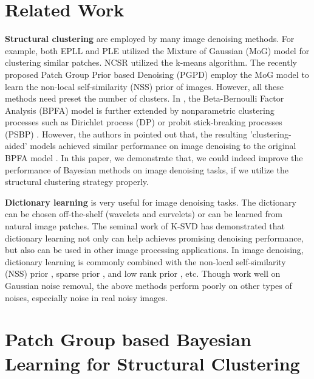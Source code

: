 \documentclass[runningheads]{llncs}
\begin{document}
\section{Related Work}
\textbf{Structural clustering} are employed by many image denoising methods. For example, both EPLL \cite{epll} and PLE \cite{ple} utilized the Mixture of Gaussian (MoG) model \cite{prml} for clustering similar patches. NCSR \cite{ncsr} utilized the k-means algorithm. The recently proposed Patch Group Prior based Denoising (PGPD) \cite{pgpd} employ the MoG model to learn the non-local self-similarity (NSS) prior of images. However, all these methods need preset the number of clusters. In \cite{bpfa}, the Beta-Bernoulli Factor Analysis (BPFA) model is further extended by nonparametric clustering processes such as Dirichlet process (DP) \cite{ferguson1973bayesian} or probit stick-breaking processes (PSBP) \cite{ren2011logistic}. However, the authors in \cite{bpfa} pointed out that, the resulting 'clustering-aided' models achieved similar performance on image denoising to the original BPFA model \cite{bpfa}. In this paper, we demonstrate that, we could indeed improve the performance of Bayesian methods on image denoising tasks, if we utilize the structural clustering strategy properly.

\textbf{Dictionary learning} is very useful for image denoising tasks. The dictionary can be chosen off-the-shelf (wavelets and curvelets) or can be learned from natural image patches. The seminal work of K-SVD \cite{ksvd} has demonstrated that dictionary learning not only can help achieves promising denoising performance, but also can be used in other image processing applications. In image denoising, dictionary learning is commonly combined with the non-local self-similarity (NSS) prior \cite{nlm,pgpd}, sparse prior \cite{bm3d,lssc,ncsr}, and low rank prior \cite{wnnm}, etc. Though work well on Gaussian noise removal, the above methods perform poorly on other types of noises, especially noise in real noisy images.
\vspace{-0.1in}
\section{Patch Group based Bayesian Learning for Structural Clustering}\label{sec2}
\end{document}
